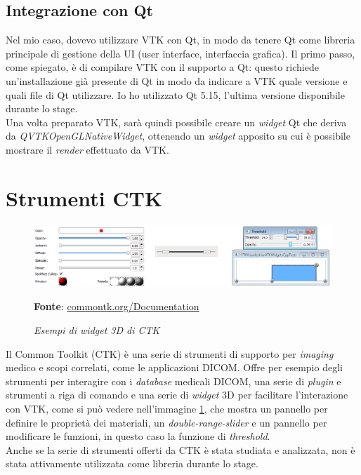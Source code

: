 \subsection{Integrazione con Qt}\label{sec:qt-integrazione}
Nel mio caso, dovevo utilizzare VTK con Qt, in modo da tenere Qt come libreria principale di gestione della UI (user interface, interfaccia grafica). Il primo passo, come spiegato, è di compilare VTK con il supporto a Qt: questo richiede un'installazione già presente di Qt in modo da indicare a VTK quale versione e quali file di Qt utilizzare. Io ho utilizzato Qt 5.15, l'ultima versione disponibile durante lo stage.\\
Una volta preparato VTK, sarà quindi possibile creare un \emph{widget} Qt che deriva da \emph{QVTKOpenGLNativeWidget}, ottenendo un \emph{widget} apposito su cui è possibile mostrare il \emph{render} effettuato da VTK.

\section{Strumenti CTK}
\begin{figure}[h]
    \centering
    \includegraphics[scale=0.35]{immagini/volumerendering/ctkwidgets.png}
    \caption{\textit{Esempi di widget 3D di CTK}}
    \textbf{Fonte}: \href{https://commontk.org/index.php/Documentation/ImageGallery}{commontk.org/Documentation}
    \label{fig: CTK 3D Widgets}
\end{figure}

Il Common Toolkit (CTK) è una serie di strumenti di supporto per \emph{imaging} medico e scopi correlati, come le applicazioni DICOM. Offre per esempio degli strumenti per interagire con i \emph{database} medicali DICOM, una serie di \emph{plugin} e strumenti a riga di comando e una serie di \emph{widget} 3D per facilitare l'interazione con VTK, come si può vedere nell'immagine \ref{fig: CTK 3D Widgets}, che mostra un pannello per definire le proprietà dei materiali, un \emph{double-range-slider} e un pannello per modificare le funzioni, in questo caso la funzione di \emph{threshold}.
\\
Anche se la serie di strumenti offerti da CTK è stata studiata e analizzata, non è stata attivamente utilizzata come libreria durante lo stage.

